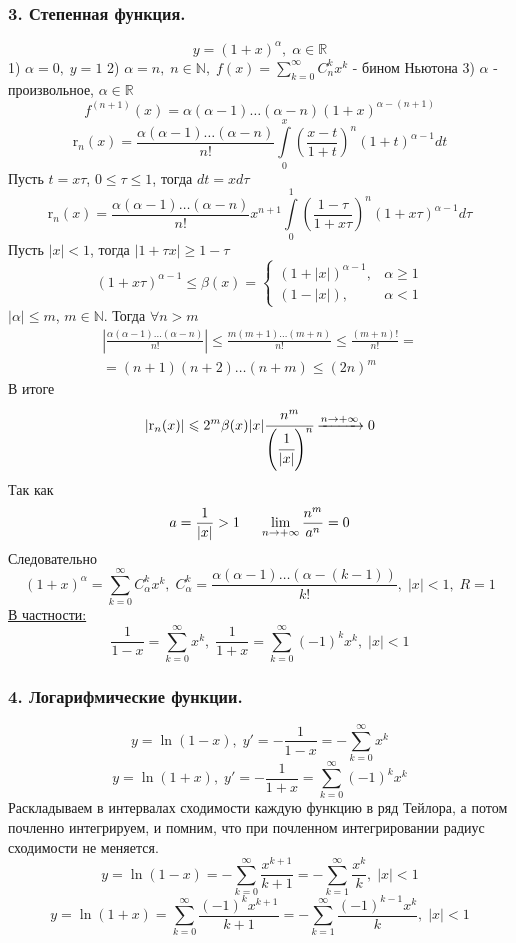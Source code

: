 \documentclass[a4paper,12pt]{article} %
\newcommand{\ryad}{\sum\limits^{\infty}_{k = 0}}
\renewcommand {\geq}{\geqslant}
\begin{document}
\subsubsection*{3. Степенная функция.}
$$y = (1 + x)^{\alpha}, \; \alpha \in \mathbb{R}$$
1) $\alpha = 0, \; y = 1$
2) $\alpha = n, \; n \in \mathbb{N}, \; f(x) = \ryad C^k_n x^k$ - бином Ньютона
3) $\alpha$ - произвольное, $\alpha \in \mathbb{R}$
$$ 
f^{(n + 1)}(x) = \alpha (\alpha - 1) \ldots (\alpha - n) (1 + x)^{\alpha - (n + 1)} $$
$$
\mathrm{r}_n(x) = \frac{\alpha(\alpha - 1) \ldots (\alpha - n)}{n!} \int\limits_0^x \left(\frac{x - t}{1 + t} \right)^n (1 + t)^{\alpha - 1} dt
$$
Пусть $t = x \tau$, $0 \leqslant \tau \leqslant 1$, тогда $dt = x d \tau$
$$
\mathrm{r}_n(x) =  \frac{\alpha(\alpha - 1) \ldots (\alpha - n)}{n!} x^{n + 1} \int\limits_0^1 \left( \frac{1 - \tau}{1 + x\tau} \right)^n ( 1 + x \tau)^{\alpha - 1} d \tau
$$
Пусть $|x| < 1$, тогда $|1 + \tau x| \geqslant 1 - \tau$
\begin{equation*}
(1+x \tau)^{\alpha-1} \leqslant \beta(x)=
\begin{cases}
	(1+|x|)^{\alpha-1}, & \alpha \geq 1 \\
	(1-|x|), & \alpha<1
\end{cases}
\end{equation*}
$ | \alpha | \leqslant m $, $m \in \mathbb{N}$. Тогда $\forall n > m$
\begin{multline*}
\left| \frac{\alpha(\alpha - 1) \ldots (\alpha - n)}{n!} \right| \leqslant \frac{m (m + 1) \ldots (m + n)}{n!} \leqslant \frac{(m + n)!}{n!} = \\
= (n + 1)(n + 2) \ldots (n + m)\leqslant (2n)^m
\end{multline*}
В итоге
$$ 
\left| \mathrm{r}_n (x) \right| \leqslant 2^m \beta (x) |x| \cfrac{n^m}{\left(\cfrac{1}{|x|}\right)^n} \xrightarrow{n \rightarrow + \infty} 0
$$
Так как 
$$
a = \frac{1}{|x|} > 1 \hspace{0.5cm} \lim\limits_{n \rightarrow + \infty} \frac{n^m}{a^n} = 0$$
Следовательно 
$$
(1 + x)^{\alpha} = \ryad C_{\alpha}^k x^k, \; C_{\alpha}^k = \frac{\alpha (\alpha - 1) \ldots (\alpha - (k -1))}{k!}, \; |x| < 1, \; R = 1 
$$
\underline{В частности:}
$$
\frac{1}{1 - x} = \ryad x^k, \; \frac{1}{1 + x} = \ryad (-1)^k x^k, \; |x| < 1
$$
\subsubsection*{4. Логарифмические функции.}
$$
y = \ln(1 - x), \; y' = - \frac{1}{1 - x} = - \ryad x^k
$$
$$
y = \ln(1 + x), \; y' = - \frac{1}{1 + x} = \ryad (-1)^k x^k
$$
Раскладываем в интервалах сходимости каждую функцию в ряд Тейлора, а потом почленно интегрируем, и помним, что при почленном интегрировании радиус сходимости не меняется. 
$$ 
y = \ln(1 - x) = - \ryad \frac{x^{k + 1}}{k + 1} = - \sum\limits^{\infty}_{k = 1} \frac{x^k}{k}, \; |x| < 1
$$
$$
y = \ln(1 + x) = \ryad \frac{(-1)^k x^{k + 1}}{k + 1} = - \sum\limits^{\infty}_{k = 1} \frac{(-1)^{k - 1} x^k}{k}, \; |x| < 1
$$
\end{document}
